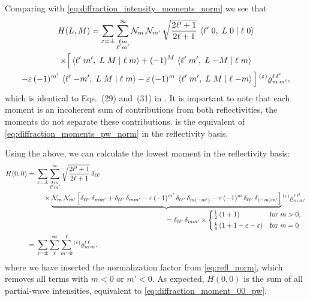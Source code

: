 Comparing with \cref{eq:diffraction_intensity_moments_norm} we see
that
\begin{multline}
  \label{eq:diffraction_moments_pw_refl_norm}
  H(L, M)
  = \sum_{\varepsilon = \pm} \sum_{\substack{\ell m \\ \ell' m'}}^\infty
  \mathcal{N}_m\, \mathcal{N}_{m'}\,
  \sqrt{\frac{2 \ell' + 1}{2 \ell + 1}}\,
  \braket{{\ell'}\;{0},\;{L}\;{0}\; |\; {\ell}\;{0}}
  \\
  \times \Big[
    \braket{{\ell'}\;{m'},\;{L}\;{M}\; |\; {\ell}\;{m}}
    + (-1)^M\, \braket{{\ell'}\;{m'},\;{L}\;{-M}\; |\; {\ell}\;{m}}
    \\
    - \varepsilon\, (-1)^{m'}\, \braket{{\ell'}\;{-m'},\;{L}\;{M}\; |\; {\ell}\;{m}}
    - \varepsilon\, (-1)^m\, \braket{{\ell'}\;{m'},\;{L}\;{M}\; |\; {\ell}\;{-m}} \Big]
  \prescript{(\ensuremath{\varepsilon})}{}{\varrho}^{\ell\, \ell'}_{m\, m'},
\end{multline}
which is identical to Eqs.~(29) and~(31) in .
It is important to note that each moment is an incoherent sum of
contributions from both reflectivities, \ie the moments do not
separate these contributions.
 is the equivalent of
\cref{eq:diffraction_moments_pw_norm} in the reflectivity basis.

Using the above, we can calculate the lowest moment in the
reflectivity basis:
\begin{align}
  H(0, 0)
  ={}& \begin{multlined}[t]
    \sum_{\refl = \pm} \sum_{\substack{\ell m \\ \ell' m'}}^\infty
    \sqrt{\frac{2 \ell' + 1}{2 \ell + 1}}\,
    \delta_{\ell \ell'}
    \\
    \times \rdUnderbrace{\mathcal{N}_m\, \mathcal{N}_{m'} \sBrk[2]{%
      \delta_{\ell \ell'}\, \delta_{m m'}
      + \delta_{\ell \ell'}\, \delta_{m m'}
      - \refl\, (-1)^{m'}\, \delta_{\ell \ell'}\, \delta_{m (-m')}
      - \refl\, (-1)^m\, \delta_{\ell \ell'}\, \delta_{(-m) m'}}}%
      {= \delta_{\ell \ell'}\, \delta_{m m'} \times
      \begin{cases*}
        \frac{1}{2}\, (1 + 1)                 & for $m > 0$, \\
        \frac{1}{4}\, (1 + 1 - \refl - \refl) & for $m = 0$
      \end{cases*}}
    \prescript{(\refl)}{}{\varrho}^{\ell\, \ell'}_{m\, m'}
  \end{multlined} \nonumber
  \\
  \label{eq:diffraction_moment_00_pw_refl}
  ={}& \sum_{\refl = \pm} \sum_\ell^\infty \sum_{m = 0}^\ell \prescript{(\refl)}{}{\varrho}^{\ell\, \ell}_{m\, m},
\end{align}
where we have inserted the normalization factor from
\cref{eq:refl_norm}, which removes all terms with $m < 0$ or $m' < 0$.
As expected, $H(0, 0)$ is the sum of all partial-wave intensities,
equivalent to \cref{eq:diffraction_moment_00_pw}.


